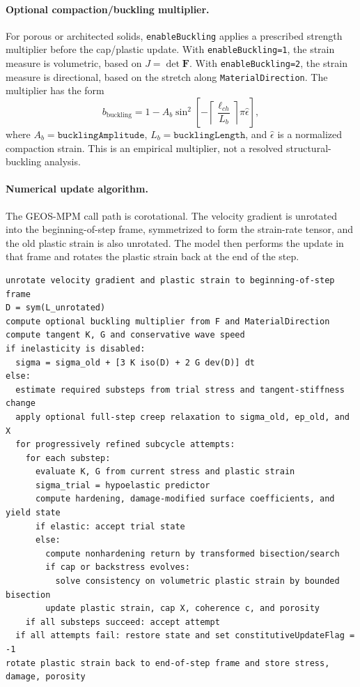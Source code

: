\paragraph{Optional compaction/buckling multiplier.}
For porous or architected solids, \texttt{enableBuckling} applies a prescribed strength multiplier before the cap/plastic update.  With \texttt{enableBuckling=1}, the strain measure is volumetric, based on \(J=\det\mathbf{F}\).  With \texttt{enableBuckling=2}, the strain measure is directional, based on the stretch along \texttt{MaterialDirection}.  The multiplier has the form
\begin{equation}
  b_{\mathrm{buckling}} = 1-A_b\sin^2\left[-\left\lceil\frac{\ell_{ch}}{L_b}\right\rceil\pi\hat\epsilon\right],
  \label{eq:geomechanics-buckling}
\end{equation}
where \(A_b=\texttt{bucklingAmplitude}\), \(L_b=\texttt{bucklingLength}\), and \(\hat\epsilon\) is a normalized compaction strain.  This is an empirical multiplier, not a resolved structural-buckling analysis.

\paragraph{Numerical update algorithm.}
The GEOS-MPM call path is corotational.  The velocity gradient is unrotated into the beginning-of-step frame, symmetrized to form the strain-rate tensor, and the old plastic strain is also unrotated.  The model then performs the update in that frame and rotates the plastic strain back at the end of the step.

\begin{lstlisting}[caption={Geomechanics update structure.},label={alg:geomechanics-update},basicstyle=\ttfamily\small]
unrotate velocity gradient and plastic strain to beginning-of-step frame
D = sym(L_unrotated)
compute optional buckling multiplier from F and MaterialDirection
compute tangent K, G and conservative wave speed
if inelasticity is disabled:
  sigma = sigma_old + [3 K iso(D) + 2 G dev(D)] dt
else:
  estimate required substeps from trial stress and tangent-stiffness change
  apply optional full-step creep relaxation to sigma_old, ep_old, and X
  for progressively refined subcycle attempts:
    for each substep:
      evaluate K, G from current stress and plastic strain
      sigma_trial = hypoelastic predictor
      compute hardening, damage-modified surface coefficients, and yield state
      if elastic: accept trial state
      else:
        compute nonhardening return by transformed bisection/search
        if cap or backstress evolves:
          solve consistency on volumetric plastic strain by bounded bisection
        update plastic strain, cap X, coherence c, and porosity
    if all substeps succeed: accept attempt
  if all attempts fail: restore state and set constitutiveUpdateFlag = -1
rotate plastic strain back to end-of-step frame and store stress, damage, porosity
\end{lstlisting}

